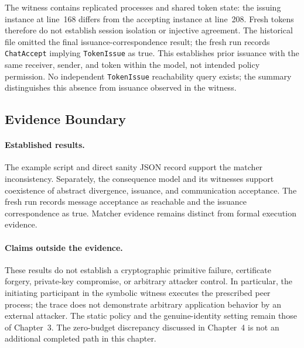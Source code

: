 The witness contains replicated processes and shared token state: the issuing
instance at line~168 differs from the accepting instance at line~208. Fresh
tokens therefore do not establish session isolation or injective agreement.
The historical file omitted the final issuance-correspondence result; the
fresh run records \texttt{ChatAccept} implying \texttt{TokenIssue} as true.
This establishes prior issuance with the same receiver, sender, and token
within the model, not intended policy permission. No independent
\texttt{TokenIssue} reachability query exists; the summary distinguishes this
absence from issuance observed in the witness.


\subsection{Evidence Boundary}

\paragraph{Established results.}
The example script and direct sanity JSON record support the matcher
inconsistency. Separately, the
consequence model and its witnesses support coexistence of abstract divergence,
issuance, and communication acceptance. The fresh run records message
acceptance as reachable and the issuance correspondence as true. Matcher
evidence remains distinct from formal execution evidence.

\paragraph{Claims outside the evidence.}
These results do not establish a cryptographic primitive failure, certificate
forgery, private-key compromise, or arbitrary attacker control. In particular,
the initiating participant in the symbolic witness executes the prescribed
peer process; the trace does not demonstrate arbitrary application behavior
by an external attacker. The static policy and the genuine-identity setting
remain those of Chapter~3. The zero-budget discrepancy discussed in Chapter~4
is not an additional completed path in this chapter.

